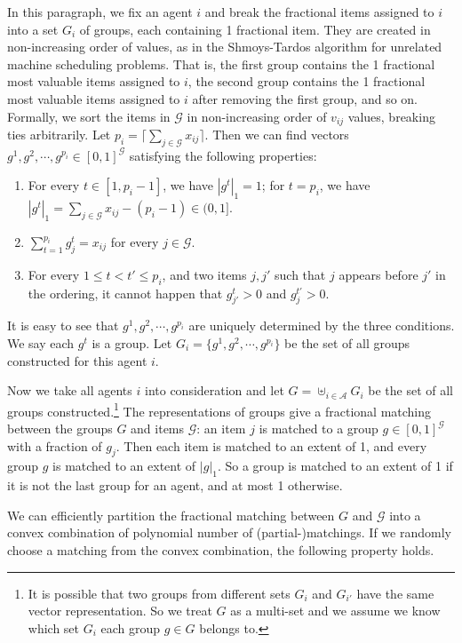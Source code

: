 \documentclass[10pt,a4paper]{article}
\theoremstyle{definition}
\theoremstyle{plain}
\newcommand\calA{{\mathcal{A}}}
\newcommand\calG{{\mathcal{G}}}
\newcommand\ceil[1]{{\lceil#1\rceil}}
\begin{document}
    In this paragraph, we fix an agent $i$ and break the fractional items assigned to $i$ into a set $G_i$ of groups, each containing 1 fractional item. They are created in non-increasing order of values, as in the Shmoys-Tardos algorithm for unrelated machine scheduling problems. That is, the first group contains the 1 fractional most valuable items assigned to $i$, the second group contains the 1 fractional most valuable items assigned to $i$ after removing the first group, and so on. Formally, we sort the items in $\calG$ in non-increasing order of $v_{ij}$ values, breaking ties arbitrarily. Let $p_i = \ceil{\sum_{j \in \calG} x_{ij}}$. Then we can find vectors $g^1, g^2, \cdots, g^{p_i} \in [0, 1]^{\calG}$ satisfying the following properties:
    \begin{enumerate}[label = (P\arabic*)]
        \item For every $t \in [1, p_i-1]$, we have $|g^t|_1 = 1$; for $t = p_i$, we have $|g^t|_1 = \sum_{j \in \calG}x_{ij} - (p_i - 1) \in (0, 1]$.
        \item $\sum_{t = 1}^{p_i}g^t_j = x_{ij}$ for every $j \in \calG$.
        \item For every $1 \leq t < t' \leq p_i$, and two items $j, j'$ such that $j$ appears before $j'$ in the ordering, it cannot happen that $g^t_{j'} > 0$ and $g^{t'}_j > 0$.
    \end{enumerate}
    It is easy to see that $g^1, g^2, \cdots, g^{p_i}$ are uniquely determined by the three conditions. We say each $g^t$ is a group. Let $G_i = \{g^1, g^2, \cdots, g^{p_i}\}$ be the set of all groups constructed for this agent $i$. 
    \medskip

    Now we take all agents $i$ into consideration and let $G = \uplus_{i \in \calA}G_i$ be the set of all groups constructed.\footnote{It is possible that two groups from different sets $G_i$ and $G_{i'}$ have the same vector representation. So we treat $G$ as a multi-set and we assume we know which set $G_i$ each group $g \in G$ belongs to.} The representations of groups give a fractional matching between the groups $G$ and items $\calG$: an item $j$ is matched to a group $g \in [0, 1]^{\calG}$ with a fraction of $g_j$.  Then each item is matched to an extent of 1, and every group $g$ is matched to an extent of $|g|_1$. So a group is matched to an extent of 1 if it is not the last group for an agent, and at most 1 otherwise.  
    
    We can efficiently partition the fractional matching between $G$ and $\calG$ into a convex combination of polynomial number of (partial-)matchings.  If we randomly choose a matching from the convex combination, the following property holds. 
\end{document}

